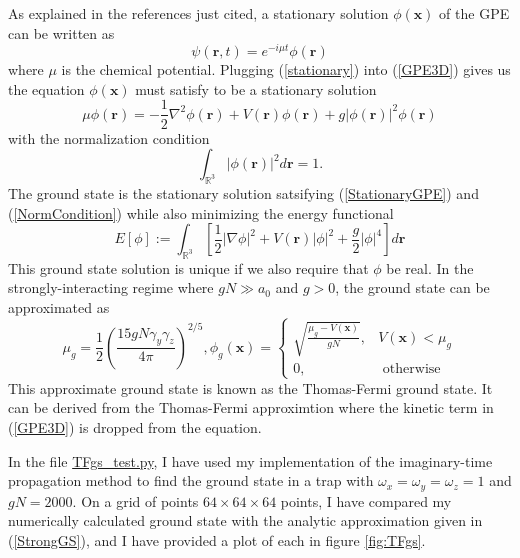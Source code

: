 \documentclass[12]{article}
\begin{document}
As explained in the references just cited, a stationary solution $\phi(\textbf{x})$ of the GPE can be written as
\begin{equation}
\psi(\textbf{r},t)  = e^{-i\mu t}\phi(\textbf{r})
\label{stationary}
\end{equation}
where $\mu$ is the chemical potential. Plugging (\ref{stationary}) into (\ref{GPE3D}) gives us the equation $\phi(\textbf{x})$ must satisfy to be a stationary solution
\begin{equation}
\mu \phi(\mathbf{r})=-\frac{1}{2} \nabla^{2} \phi(\mathbf{r})+V(\mathbf{r}) \phi(\mathbf{r})+ g|\phi(\mathbf{r})|^{2} \phi(\mathbf{r})
\label{StationaryGPE}
\end{equation}
with the normalization condition
\begin{equation}
\int_{\mathbb{R}^{3}}|\phi(\mathbf{r})|^{2} d \mathbf{r}=1.
\label{NormCondition}
\end{equation}
The ground state is the stationary solution satsifying (\ref{StationaryGPE}) and (\ref{NormCondition}) while also minimizing the energy functional
\begin{equation}
E[\phi] := \int_{\mathbb{R}^{3}} \left[ \frac1{2} |\nabla \phi|^{2}  + V(\textbf{r})|\phi|^{2} + \frac{g}{2}|\phi|^{4} \right] d \mathbf{r}
\label{Energy}
\end{equation}
This ground state solution is unique if we also require that $\phi$ be real. In the strongly-interacting regime where $g N \gg a_{0}$ and $g > 0$, the ground state can be approximated as 
\begin{equation}
\mu_{g}=\frac{1}{2}\left(\frac{15 gN \gamma_y\gamma_{z}}{4 \pi}\right)^{2 / 5}, \phi_{g}(\mathbf{x})=\left\{\begin{array}{ll}{\sqrt{\frac{\mu_{g}-V(\mathbf{x}) }{gN}},} & {V(\mathbf{x})<\mu_{g}} \\ {0,} & {\text { otherwise }}\end{array}\right.
\label{StrongGS}
\end{equation}
This approximate ground state is known as the Thomas-Fermi ground state. It can be derived from the Thomas-Fermi approximtion where the kinetic term in (\ref{GPE3D}) is dropped from the equation.

In the file \href{https://github.com/TimSkaras/GPE-SpectralMethod/blob/master/Tests/TFgs_test.py}{TFgs\_test.py}, I have used my implementation of the imaginary-time propagation method to find the ground state in a trap with $\omega_x = \omega_y = \omega_z = 1$ and $gN = 2000$. On a grid of points $64 \times 64 \times 64$ points, I have compared my numerically calculated ground state with the analytic approximation given in (\ref{StrongGS}), and I have provided a plot of each in figure \ref{fig:TFgs}. 
\end{document}

